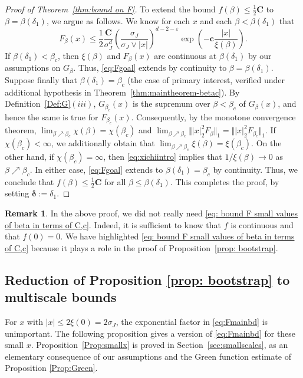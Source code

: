 \documentclass[11pt,a4paper]{article}
\numberwithin{equation}{section}
\theoremstyle{plain}
\theoremstyle{definition}
\newtheorem{Rem}[Thm]{Remark}
\newcommand\1{\mathds{1}}
\newcommand\bfc{\mathbf{c}}
\newcommand\bfC{\mathbf{C}}
\newcommand{\deltamain}{\boldsymbol{\delta}}
\begin{document}
\begin{proof}[Proof of Theorem~\textup{\ref{thm:bound on F}}]
To extend the bound $f(\beta) \le \frac 12 \bfC$ to $\beta=\beta(\delta_1)$, we argue as follows.
We know for each $x$ and each $\beta<\beta(\delta_1)$ that
\begin{equation}
\label{eq:Fgoal}
    F_\beta(x) \le \frac 12 \frac{\bfC}{\sigma_J^d}\left(\frac{\sigma_J}{\sigma_J\vee|x|}\right)^{d-2-\varepsilon} \exp\left(-\bfc \frac{|x|}{\xi(\beta)}\right).
\end{equation}
If $\beta(\delta_1)<\beta_c$, then $\xi(\beta)$ and $F_\beta(x)$ are continuous at
$\beta(\delta_1)$ by our assumptions on $G_\beta$.  Thus, \eqref{eq:Fgoal} extends by continuity to $\beta=\beta(\delta_1)$.
Suppose finally that $\beta(\delta_1)=\beta_c$ (the case of primary interest, verified under additional
hypothesis in Theorem~\ref{thm:maintheorem-betac}).
By Definition~\ref{Def:G}$(iii)$, $G_{\beta_c}(x)$
is the supremum over $\beta<\beta_c$ of $G_{\beta}(x)$, and hence
the same is true for $F_{\beta_c}(x)$. Consequently,
by the monotone convergence theorem, $\lim_{\beta\nearrow \beta_c}\chi(\beta)=\chi(\beta_c)$ and $\lim_{\beta\nearrow \beta_c}\Vert |x|_2^2F_\beta\Vert_1=\Vert |x|_2^2F_{\beta_c}\Vert_1$. If $\chi(\beta_c)<\infty$, we additionally obtain that $\lim_{\beta\nearrow \beta_c}\xi(\beta)=\xi(\beta_c)$.
On the other hand, if $\chi(\beta_c)=\infty$,
then \eqref{eq:xichiintro} implies that $1/\xi(\beta) \to
0$ as $\beta\nearrow \beta_c$. In either case, \eqref{eq:Fgoal}
extends to $\beta(\delta_1)=\beta_c$ by continuity. Thus, we conclude that $f(\beta) \le \frac 12 \bfC$ for all $\beta \le \beta(\delta_1)$.
This completes the proof, by setting $\deltamain:=\delta_1$.
\end{proof}

\begin{Rem} In the above proof, we did not really need \eqref{eq: bound F small values of beta in terms of C,c}. Indeed,  it is sufficient to know that $f$ is continuous and that $f(0)=0$.
We have highlighted \eqref{eq: bound F small values of beta in terms of C,c} because it plays a role in the proof of Proposition~\ref{prop: bootstrap}.
\end{Rem}

\subsection{Reduction of Proposition \ref{prop: bootstrap} to multiscale bounds}
\label{sec:overview main props}

For $x$ with $|x|\leq 2\xi(0)=2\sigma_J$, the exponential
factor in \eqref{eq:Fmainbd} is unimportant.
The following proposition gives a version of \eqref{eq:Fmainbd}
for these small $x$.
Proposition~\ref{Prop:smallx} is proved in Section~\ref{sec:smallscales},
as an elementary consequence of our assumptions and the Green function estimate of Proposition \ref{Prop:Green}.
\end{document}
